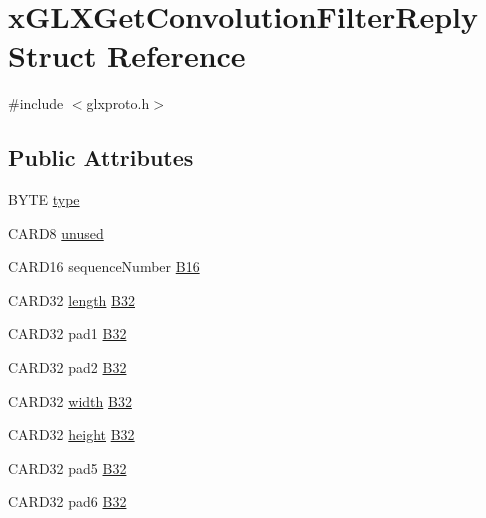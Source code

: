 \hypertarget{structx_g_l_x_get_convolution_filter_reply}{}\section{x\+G\+L\+X\+Get\+Convolution\+Filter\+Reply Struct Reference}
\label{structx_g_l_x_get_convolution_filter_reply}


{\ttfamily \#include $<$glxproto.\+h$>$}

\subsection*{Public Attributes}
\begin{DoxyCompactItemize}
\item 
B\+Y\+TE \hyperlink{structx_g_l_x_get_convolution_filter_reply_a64caee0ea3e58bd7eb24856b50864259}{type}
\item 
C\+A\+R\+D8 \hyperlink{structx_g_l_x_get_convolution_filter_reply_a944f429a01745a999eb8eb0c369b9b99}{unused}
\item 
C\+A\+R\+D16 sequence\+Number \hyperlink{structx_g_l_x_get_convolution_filter_reply_afc79a6def7a60aa42df0c1327a5f6fc9}{B16}
\item 
C\+A\+R\+D32 \hyperlink{glcorearb_8h_ab9c919755bde3b34349e23a32b4e0fa7}{length} \hyperlink{structx_g_l_x_get_convolution_filter_reply_a722afd22e5f617116120a66c52bbf162}{B32}
\item 
C\+A\+R\+D32 pad1 \hyperlink{structx_g_l_x_get_convolution_filter_reply_a2e0665844f99aab75c7caafb6a65cde6}{B32}
\item 
C\+A\+R\+D32 pad2 \hyperlink{structx_g_l_x_get_convolution_filter_reply_aad4619956fc7eb576423fff2bc85203d}{B32}
\item 
C\+A\+R\+D32 \hyperlink{gl_8h_a9a82cf3caff84cabc4598e2619faac17}{width} \hyperlink{structx_g_l_x_get_convolution_filter_reply_abbb1e61fbf31f039780fa9aeecb17f1c}{B32}
\item 
C\+A\+R\+D32 \hyperlink{gl_8h_aa352f2804b9902ac30769c00dde75d5f}{height} \hyperlink{structx_g_l_x_get_convolution_filter_reply_a0a8930b4a70ef9398bf869104c5083e9}{B32}
\item 
C\+A\+R\+D32 pad5 \hyperlink{structx_g_l_x_get_convolution_filter_reply_a6d2e151d76cc9b76e2287bc6aa34eee2}{B32}
\item 
C\+A\+R\+D32 pad6 \hyperlink{structx_g_l_x_get_convolution_filter_reply_a250a184d820b96560dda32503c041cfd}{B32}
\end{DoxyCompactItemize}


